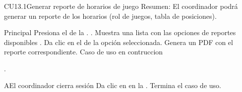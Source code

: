 
	\begin{UseCase}{CU13.1}{Generar reporte de horarios de juego}{
		Resumen: El coordinador podrá generar un reporte de los horarios (rol de juegos, tabla de posiciones). }
	\end{UseCase}
	\newpage
	\begin{UCtrayectoria}{Principal}
	\UCpaso[\UCactor] Presiona el  de la  .	.
	\UCpaso Muestra una lista con las opciones de reportes disponibles .
	\UCpaso[\UCactor] Da clic en el  de la opción seleccionada.
	\UCpaso Genera un PDF con el reporte correspondiente.
	\UCpaso Caso de uso en contruccion
	
	.
\end{UCtrayectoria}

	\begin{UCtrayectoriaA}{A}{El coordinador cierra sesión}
		\UCpaso[\UCactor] Da clic en   en la .
		\UCpaso Termina el caso de uso.
	\end{UCtrayectoriaA}

	

